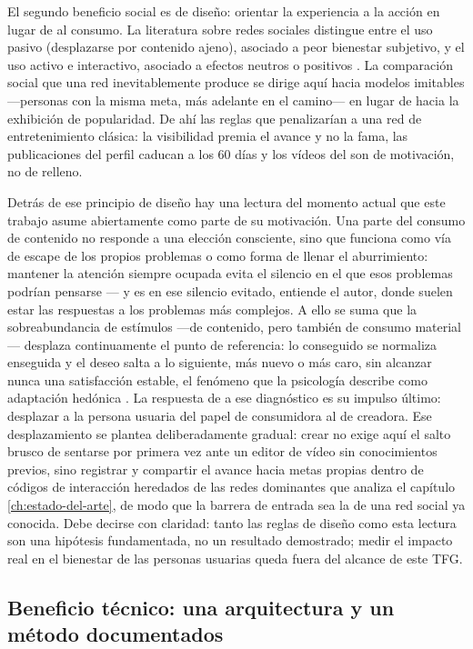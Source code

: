 El segundo beneficio social es de diseño: orientar la experiencia a la acción en lugar de al consumo.
La literatura sobre redes sociales distingue entre el uso pasivo (desplazarse por contenido ajeno), asociado a peor bienestar subjetivo, y el uso activo e interactivo, asociado a efectos neutros o positivos \parencite{verduyn-sns}.
La comparación social que una red inevitablemente produce \parencite{festinger-comparison} se dirige aquí hacia modelos imitables —personas con la misma meta, más adelante en el camino— en lugar de hacia la exhibición de popularidad.
De ahí las reglas que penalizarían a una red de entretenimiento clásica: la visibilidad premia el avance y no la fama, las publicaciones del perfil caducan a los 60 días y los vídeos del  son de motivación, no de relleno.

Detrás de ese principio de diseño hay una lectura del momento actual que este trabajo asume abiertamente como parte de su motivación.
Una parte del consumo de contenido no responde a una elección consciente, sino que funciona como vía de escape de los propios problemas o como forma de llenar el aburrimiento: mantener la atención siempre ocupada evita el silencio en el que esos problemas podrían pensarse — y es en ese silencio evitado, entiende el autor, donde suelen estar las respuestas a los problemas más complejos.
A ello se suma que la sobreabundancia de estímulos —de contenido, pero también de consumo material— desplaza continuamente el punto de referencia: lo conseguido se normaliza enseguida y el deseo salta a lo siguiente, más nuevo o más caro, sin alcanzar nunca una satisfacción estable, el fenómeno que la psicología describe como adaptación hedónica \parencite{brickman-campbell}.
La respuesta de \bukit a ese diagnóstico es su impulso último: desplazar a la persona usuaria del papel de consumidora al de creadora.
Ese desplazamiento se plantea deliberadamente gradual: crear no exige aquí el salto brusco de sentarse por primera vez ante un editor de vídeo sin conocimientos previos, sino registrar y compartir el avance hacia metas propias dentro de códigos de interacción heredados de las redes dominantes que analiza el capítulo \ref{ch:estado-del-arte}, de modo que la barrera de entrada sea la de una red social ya conocida.
Debe decirse con claridad: tanto las reglas de diseño como esta lectura son una hipótesis fundamentada, no un resultado demostrado; medir el impacto real en el bienestar de las personas usuarias queda fuera del alcance de este \ac{TFG}.

\subsection{Beneficio técnico: una arquitectura y un método documentados}
\label{sec:beneficios-tecnico}

